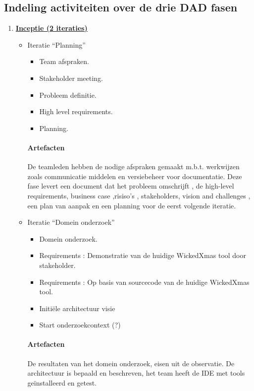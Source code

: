 
\subsection{Indeling activiteiten over de drie DAD fasen}
\begin{enumerate}
\item \underline{\textbf{Inceptie (2 iteraties)}}
		\begin{itemize}
		\item Iteratie ``Planning''
			\begin{itemize}
			\item Team afspraken.
			\item Stakeholder meeting.
			\item Probleem definitie.
			\item High level requirements.
			\item Planning.
			\end{itemize}
		\paragraph{Artefacten}
		De teamleden hebben de nodige afspraken gemaakt m.b.t. werkwijzen zoals
		communicatie middelen en versiebeheer voor documentatie. Deze fase levert
		een document dat het probleem omschrijft , de high-level requirements,
		business case ,risiso's , stakeholders, vision and challenges , een plan van
		aanpak en een planning voor de eerst volgende iteratie.
		\item Iteratie ``Domein onderzoek''
			\begin{itemize}
			\item Domein onderzoek.
			\item Requirements : Demonstratie van de huidige WickedXmas tool door
			stakeholder.
			\item Requirements : Op basis van sourcecode van de huidige WickedXmas tool.
			\item Initi\"ele architectuur visie
			\item Start onderzoekcontext (?)
			\end{itemize}
		\paragraph{Artefacten}
		De resultaten van het domein onderzoek, eisen uit de observatie.
		De architectuur is bepaald en beschreven, het team heeft de IDE met tools
		ge\"{i}nstalleerd en getest.
		\end{itemize}



\end{enumerate}
